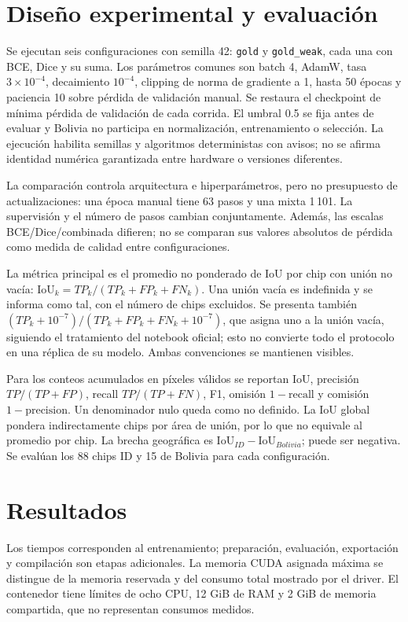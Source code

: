\section{Diseño experimental y evaluación}
Se ejecutan seis configuraciones con semilla 42: \texttt{gold} y \texttt{gold\_weak},
cada una con BCE, Dice y su suma. Los parámetros comunes son batch 4, AdamW,
tasa $3\times10^{-4}$, decaimiento $10^{-4}$, clipping de norma de gradiente a 1,
hasta 50 épocas y paciencia 10 sobre pérdida de validación manual. Se restaura el
checkpoint de mínima pérdida de validación de cada corrida. El umbral 0.5 se fija antes
de evaluar y Bolivia no participa en normalización, entrenamiento o selección.
La ejecución habilita semillas y algoritmos deterministas con avisos; no se afirma
identidad numérica garantizada entre hardware o versiones diferentes.

La comparación controla arquitectura e hiperparámetros, pero no presupuesto de actualizaciones:
una época manual tiene 63 pasos y una mixta 1\,101. La supervisión y el número de pasos
cambian conjuntamente. Además, las escalas BCE/Dice/combinada difieren; no se comparan sus
valores absolutos de pérdida como medida de calidad entre configuraciones.

La métrica principal es el promedio no ponderado de IoU por chip con unión no vacía:
$\mathrm{IoU}_k=TP_k/(TP_k+FP_k+FN_k)$. Una unión vacía es indefinida y se informa
como tal, con el número de chips excluidos. Se presenta también
$(TP_k+10^{-7})/(TP_k+FP_k+FN_k+10^{-7})$, que asigna uno a la unión vacía,
siguiendo el tratamiento del notebook oficial; esto no convierte todo el protocolo en
una réplica de su modelo. Ambas convenciones se mantienen visibles.

Para los conteos acumulados en píxeles válidos se reportan IoU, precisión
$TP/(TP+FP)$, recall $TP/(TP+FN)$, F1, omisión $1-\mathrm{recall}$ y comisión
$1-\mathrm{precision}$. Un denominador nulo queda como no definido. La IoU global
pondera indirectamente chips por área de unión, por lo que no equivale al promedio por chip.
La brecha geográfica es $\mathrm{IoU}_{ID}-\mathrm{IoU}_{Bolivia}$; puede ser negativa.
Se evalúan los 88 chips ID y 15 de Bolivia para cada configuración.

\section{Resultados}


Los tiempos corresponden al entrenamiento; preparación, evaluación, exportación y compilación
son etapas adicionales. La memoria CUDA asignada máxima se distingue de la memoria reservada
y del consumo total mostrado por el driver. El contenedor tiene límites de ocho CPU,
12 GiB de RAM y 2 GiB de memoria compartida, que no representan consumos medidos.



